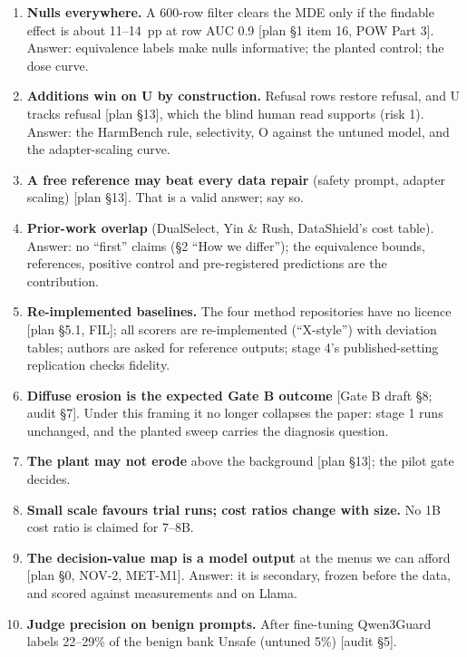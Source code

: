 \documentclass{article}
\theoremstyle{plain}
\theoremstyle{definition}
\theoremstyle{remark}
\begin{document}
\begin{enumerate}
        and cites the concurrent submission; the 7--8B recipe numbers are not
        this paper's results.
  \item \textbf{Nulls everywhere.} A 600-row filter clears the MDE only if the
        findable effect is about 11--14~pp at row AUC 0.9 [plan \S{}1 item 16,
        POW Part 3]. Answer: equivalence labels make nulls informative; the
        planted control; the dose curve.
  \item \textbf{Additions win on U by construction.} Refusal rows restore
        refusal, and U tracks refusal [plan \S{}13], which the blind human read
        supports (risk 1). Answer: the HarmBench rule, selectivity, O against
        the untuned model, and the adapter-scaling curve.
  \item \textbf{A free reference may beat every data repair} (safety prompt,
        adapter scaling) [plan \S{}13]. That is a valid answer; say so.
  \item \textbf{Prior-work overlap} (DualSelect, Yin \& Rush, DataShield's cost
        table). Answer: no ``first'' claims (\S{}2 ``How we differ''); the
        equivalence bounds, references, positive control and pre-registered
        predictions are the contribution.
  \item \textbf{Re-implemented baselines.} The four method repositories have no
        licence [plan \S{}5.1, FIL]; all scorers are re-implemented
        (``X-style'') with deviation tables; authors are asked for reference
        outputs; stage 4's published-setting replication checks fidelity.
  \item \textbf{Diffuse erosion is the expected Gate B outcome} [Gate B draft
        \S{}8; audit \S{}7]. Under this framing it no longer collapses the
        paper: stage 1 runs unchanged, and the planted sweep carries the
        diagnosis question.
  \item \textbf{The plant may not erode} above the background [plan \S{}13]; the
        pilot gate decides.
  \item \textbf{Small scale favours trial runs; cost ratios change with size.}
        No 1B cost ratio is claimed for 7--8B.
  \item \textbf{The decision-value map is a model output} at the menus we can
        afford [plan \S{}0, NOV-2, MET-M1]. Answer: it is secondary, frozen
        before the data, and scored against measurements and on Llama.
  \item \textbf{Judge precision on benign prompts.} After fine-tuning Qwen3Guard
        labels 22--29\% of the benign bank Unsafe (untuned 5\%) [audit \S{}5].

\end{enumerate}
\end{document}
